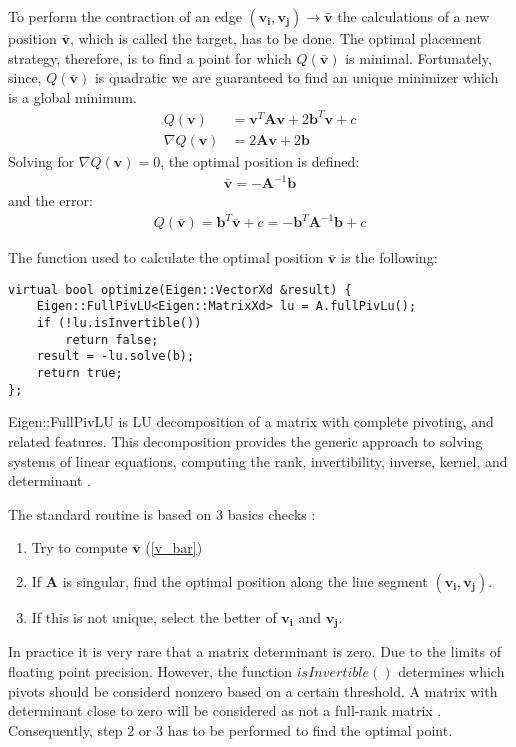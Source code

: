 To perform the contraction of an edge $(\mathbf{v_i}, \mathbf{v_j})\rightarrow\bar{\mathbf{v}}$ the calculations of a new position $\mathbf{\bar{v}}$, which is called the target, has to be done. The optimal placement strategy, therefore, is to find a point for which $Q(\mathbf{\bar{v}})$ is minimal. Fortunately, since, $Q(\mathbf{\bar{v}})$ is quadratic we are guaranteed to find an unique minimizer which is a global minimum.
\begin{align}
Q(\mathbf{v}) &= \mathbf{v}^T\mathbf{A}\mathbf{v} + 2\mathbf{b}^T\mathbf{v} + c\\
\nabla Q(\mathbf{v}) &= 2\mathbf{A}\mathbf{v} + 2 \mathbf{b}
\end{align}
Solving for $\nabla Q(\mathbf{v}) = 0$, the optimal position is defined:
\begin{align}
\mathbf{\bar{v}} = -\mathbf{A}^{-1}\mathbf{b}
\label{v_bar}
\end{align}
and the error:
\begin{align}
Q(\mathbf{\bar{v}}) = \mathbf{b}^T\mathbf{\bar{v}} + c = -\mathbf{b}^T\mathbf{A}^{-1}\mathbf{b} + c
\end{align}

The function used to calculate the optimal position $\mathbf{\bar{v}}$ is the following:
\begin{center}
\begin{lstlisting}[caption={LU decomposition for solving a linear system.},captionpos=b]
virtual bool optimize(Eigen::VectorXd &result) {
	Eigen::FullPivLU<Eigen::MatrixXd> lu = A.fullPivLu();
	if (!lu.isInvertible())
		return false;
	result = -lu.solve(b);
	return true;
};
\end{lstlisting}
\end{center}
Eigen::FullPivLU is LU decomposition of a matrix with complete pivoting, and related features. This decomposition provides the generic approach to solving systems of linear equations, computing the rank, invertibility, inverse, kernel, and determinant \cite{eigenLU19}.

The standard routine is based on 3 basics checks \cite{garland99}:
\begin{enumerate}
\item Try to compute $\mathbf{\bar{v}}$ (\ref{v_bar})
\item If $\mathbf{A}$ is singular, find the optimal position along the line segment $(\mathbf{v_i}, \mathbf{v_j})$.
\item If this is not unique, select the better of $\mathbf{v_i}$ and $ \mathbf{v_j}$.
\end{enumerate}
In practice it is very rare that a matrix determinant is zero. Due to the limits of floating point precision. However, the function $isInvertible()$ determines which pivots should be considerd nonzero based on a certain threshold. A matrix with determinant close to zero will be considered as not a full-rank matrix \cite{strang88}. Consequently, step 2 or 3 has to be performed to find the optimal point.

